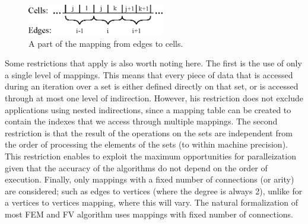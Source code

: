\begin{figure}
\centering
\includegraphics[width=6cm]{fig/svg/mapping.eps}
\caption{A part of the mapping from edges to cells.}
\label{fig:mapping}
\end{figure}


Some restrictions that apply is also worth noting here. The first is the use of 
only a single level of mappings. This means that every piece of data that is 
accessed during an iteration over a set is either defined directly on that set, 
or is accessed through at most one level of indirection. However, his 
restriction does not exclude applications using nested indirections, since a 
mapping table can be created to contain the indexes that we access through 
multiple mappings. The second restriction is that the result of the operations 
on the sets are independent from the order of processing the elements of the 
sets (to within machine precision). This restriction enables to exploit the 
maximum opportunities for paralleization given that the accuracy of the 
algorithms do not depend on the order of execution. Finally, only  mappings with 
a fixed number of connections (or arity) are considered; such as edges to 
vertices (where the degree is always 2), unlike for a vertices to vertices 
mapping, where this will vary. The natural formalization of most FEM and FV 
algorithm uses mappings with fixed number of connections.

